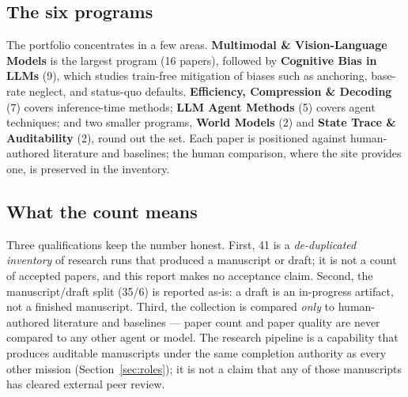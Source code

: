 \subsection{The six programs}

The portfolio concentrates in a few areas. \textbf{Multimodal \& Vision-Language
Models} is the largest program (16 papers), followed by \textbf{Cognitive Bias in
LLMs} (9), which studies train-free mitigation of biases such as anchoring,
base-rate neglect, and status-quo defaults. \textbf{Efficiency, Compression \&
Decoding} (7) covers inference-time methods; \textbf{LLM Agent Methods} (5) covers
agent techniques; and two smaller programs, \textbf{World Models} (2) and
\textbf{State Trace \& Auditability} (2), round out the set. Each paper is
positioned against human-authored literature and baselines; the human comparison,
where the site provides one, is preserved in the inventory.

\subsection{What the count means}

Three qualifications keep the number honest. First, 41 is a \emph{de-duplicated
inventory} of research runs that produced a manuscript or draft; it is not a count
of accepted papers, and this report makes no acceptance claim. Second, the
manuscript/draft split (35/6) is reported as-is: a draft is an in-progress
artifact, not a finished manuscript. Third, the collection is compared
\emph{only} to human-authored literature and baselines --- paper count and paper
quality are never compared to any other agent or model. The research pipeline is a
capability that produces auditable manuscripts under the same completion authority
as every other mission (Section~\ref{sec:roles}); it is not a claim that any of
those manuscripts has cleared external peer review.
